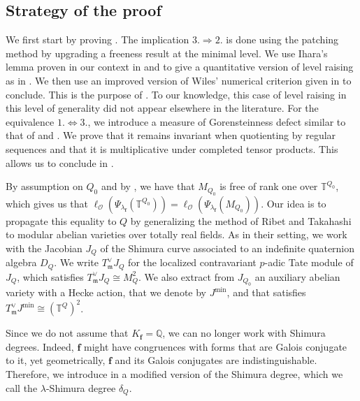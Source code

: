 \documentclass[a4paper, notitlepage, 10pt]{amsart}
\theoremstyle{plain} %
\theoremstyle{definition} %
\theoremstyle{remark} %
\numberwithin{equation}{section}
\newcommand{\bbQ}{\mathbb Q}
\newcommand{\bbT}{\mathbb T}
\begin{document}
\subsection*{Strategy of the proof}
We first start by proving . The implication $3.\Rightarrow 2.$ is done using the patching method by upgrading a freeness result at the minimal level. We use Ihara's lemma proven in our context in \cite{MS21} and \cite{Tay06} to give a quantitative version of level raising as in \cite{Diamond97}. We then use an improved version of Wiles' numerical criterion given in \cite{BIK} to conclude. This is the purpose of . To our knowledge, this case of level raising in this level of generality did not appear elsewhere in the literature. For the equivalence $1. \Leftrightarrow 3.$, we introduce a measure of Gorensteinness defect similar to that of \cite{WWE21} and \cite{KW08}. We prove that it remains invariant when
quotienting by regular sequences and that it is multiplicative under completed tensor products. This allows us to conclude in .

By assumption on $Q_0$ and by , we have that $M_{Q_0}$ is free of rank one over $\bbT^{Q_0}$, which gives us that $\ell_{\mathcal{O}}(\Psi_{\lambda_{\mathbf{f}}}(\bbT^{Q_0}))= \ell_{\mathcal{O}}(\Psi_{\lambda_{\mathbf{f}}}(M_{Q_0}))$. Our idea is to propagate this equality to $Q$ by generalizing the method of Ribet and Takahashi to modular abelian
varieties over totally real fields.  As in their setting, we work with the Jacobian $J_Q$ of the Shimura curve associated to an indefinite quaternion algebra $D_Q$.  We write $T^\vee_{\mathfrak{m}}J_Q$ for the localized contravariant $p$-adic Tate module of $J_Q$, which satisfies $T^\vee_{\mathfrak{m}}J_Q\cong M_Q^2$. We also extract from $J_{Q_0}$ an auxiliary abelian variety with a Hecke action, that we denote by $J^{\min}$, and that satisfies $T^\vee_{\mathfrak{m}}J^{\min}\cong(\bbT^Q)^2$.

Since we do not assume that $K_{\mathbf{f}}=\bbQ$, we can no longer work with Shimura degrees. Indeed, $\mathbf{f}$ might have congruences with forms that are Galois conjugate to it, yet geometrically,
$\mathbf{f}$ and its Galois conjugates are indistinguishable. Therefore, we introduce in  a modified version of the Shimura degree, which we call the $\lambda$-Shimura degree $\delta_Q$. 
\end{document}

